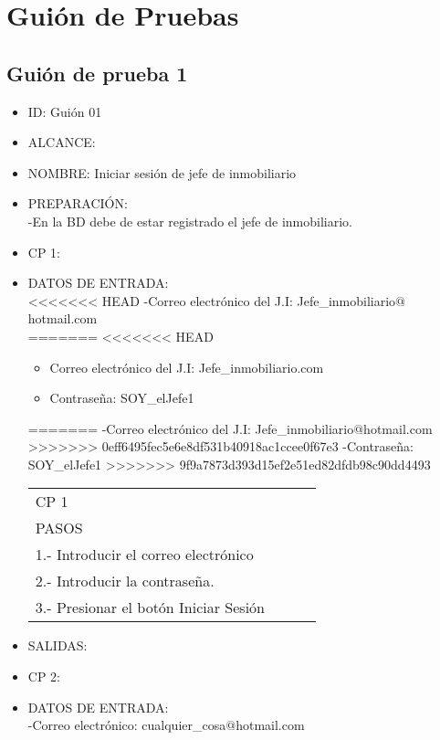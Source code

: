 \section{Guión de Pruebas}

\subsection{Guión de prueba 1}
\begin{itemize}
\item ID: Guión 01
\item ALCANCE: 
\item NOMBRE: Iniciar sesión de jefe de inmobiliario  
\item PREPARACIÓN:\\
-En la BD debe de estar registrado el jefe de inmobiliario.
\item CP 1:
\item DATOS DE ENTRADA:\\
<<<<<<< HEAD
	-Correo electrónico del J.I: Jefe\_inmobiliario$@$hotmail.com\\
=======
<<<<<<< HEAD
	\begin{itemize}
		\item Correo electrónico del J.I: Jefe\_inmobiliario\@hotmail.com
		\item Contraseña: SOY\_elJefe1
	\end{itemize}
=======
	-Correo electrónico del J.I: Jefe\_inmobiliario$@$hotmail.com
>>>>>>> 0eff6495fec5e6e8df531b40918ac1ccee0f67e3
	-Contraseña: SOY\_elJefe1
>>>>>>> 9f9a7873d393d15ef2e51ed82dfdb98c90dd4493
\begin{center}			
	\begin{tabular}{|l|l|l|l|}
		\hline
		CP 1\\
		PASOS\\
		\hline 1.- Introducir el correo electrónico\\
		\hline 2.- Introducir la contraseña.\\
		\hline 3.- Presionar el botón Iniciar Sesión\\
		\hline
	\end{tabular}
\end{center}
\item SALIDAS: \label{CU1LoginJI}
\item CP 2:
\item DATOS DE ENTRADA:\\
	-Correo electrónico: cualquier\_cosa$@$hotmail.com\\

\end{itemize}
